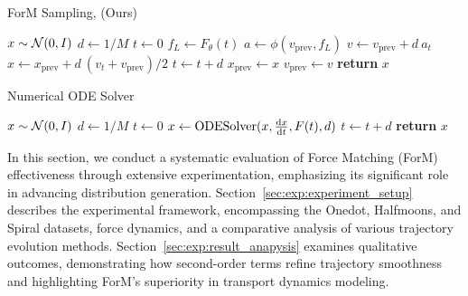 \begin{algorithm}
[!ht]
\caption{ForM Sampling, (Ours)}
\label{alg:form_sampling}
\begin{algorithmic}[1]
\State {}
\State {}
\State $x \sim \mathcal{N} (0, I)$
\State $d \gets 1 / M$
\State $t \gets 0$
\State $f_L \gets F_\theta(t)$
\State $a \gets \phi (v_\mathrm{prev}, f_L)$ 
\State $v \gets v_\mathrm{prev} + d 
~ a_t$
\State $x \gets x_\mathrm{prev} + d ~ (v_t + v_{\mathrm{prev}}) / 2$
\State $t \gets t + d$
\State $x_{\mathrm{prev}} \gets x$
\State $v_{\mathrm{prev}} \gets v$
\EndFor
\State \textbf{return} $x$
    \EndProcedure
\end{algorithmic}
\end{algorithm}


\begin{algorithm}
[!ht]
\caption{Numerical ODE Solver}
\begin{algorithmic}[1]
\State {}
\State {}
\State $x \sim \mathcal{N} (0, I)$
\State $d \gets 1 / M$
\State $t \gets 0$
\State $x \gets \mathrm{ODE Solver}(x, \frac{\mathrm{d} x}{\mathrm{d} t}, F(t), d)$ 
\State $t \gets t + d$
\EndFor
\State \textbf{return} $x$
    \EndProcedure
\end{algorithmic}
\end{algorithm}


In this section, we conduct a systematic evaluation of Force Matching (ForM) effectiveness through extensive experimentation, emphasizing its significant role in advancing distribution generation. Section~\ref{sec:exp:experiment_setup} describes the experimental framework, encompassing the Onedot, Halfmoons, and Spiral datasets, force dynamics, and a comparative analysis of various trajectory evolution methods. Section~\ref{sec:exp:result_anapysis} examines qualitative outcomes, demonstrating how second-order terms refine trajectory smoothness and highlighting ForM’s superiority in transport dynamics modeling. 

